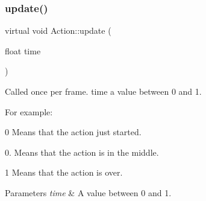 \mbox{\label{classAction_a7ee7b996fa608239a614b8c32580c245}} 
\subsubsection{\texorpdfstring{update()}{update()}\hspace{0.1cm}{\footnotesize\ttfamily [2/2]}}
{\footnotesize\ttfamily virtual void Action\+::update (\begin{DoxyParamCaption}\item[{float}]{time }\end{DoxyParamCaption})\hspace{0.3cm}{\ttfamily [virtual]}}

Called once per frame. time a value between 0 and 1.

For example\+:
\begin{DoxyItemize}
\item 0 Means that the action just started.
\item 0. Means that the action is in the middle.
\item 1 Means that the action is over.
\end{DoxyItemize}


\begin{DoxyParams}{Parameters}
{\em time} & A value between 0 and 1. \\
\hline
\end{DoxyParams}


